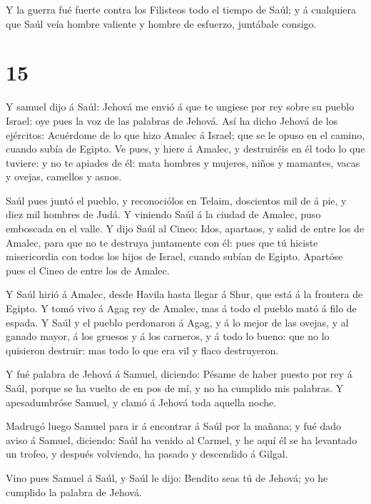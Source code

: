  Y la guerra fué fuerte contra los Filisteos todo el tiempo
de Saúl; y á cualquiera que Saúl veía hombre valiente y hombre de
esfuerzo, juntábale consigo.

\hypertarget{section-14}{%
\section{15}\label{section-14}}

 Y samuel dijo á Saúl: Jehová me envió á que te ungiese por
rey sobre su pueblo Israel: oye pues la voz de las palabras de Jehová.
 Así ha dicho Jehová de los ejércitos: Acuérdome de lo que
hizo Amalec á Israel; que se le opuso en el camino, cuando subía de
Egipto.  Ve pues, y hiere á Amalec, y destruiréis en él todo
lo que tuviere: y no te apiades de él: mata hombres y mujeres, niños y
mamantes, vacas y ovejas, camellos y asnos.

 Saúl pues juntó el pueblo, y reconociólos en Telaim,
doscientos mil de á pie, y diez mil hombres de Judá.  Y
viniendo Saúl á la ciudad de Amalec, puso emboscada en el valle.
 Y dijo Saúl al Cineo: Idos, apartaos, y salid de entre los
de Amalec, para que no te destruya juntamente con él: pues que tú
hiciste misericordia con todos los hijos de Israel, cuando subían de
Egipto. Apartóse pues el Cineo de entre los de Amalec.

 Y Saúl hirió á Amalec, desde Havila hasta llegar á Shur,
que está á la frontera de Egipto.  Y tomó vivo á Agag rey de
Amalec, mas á todo el pueblo mató á filo de espada.  Y Saúl
y el pueblo perdonaron á Agag, y á lo mejor de las ovejas, y al ganado
mayor, á los gruesos y á los carneros, y á todo lo bueno: que no lo
quisieron destruir: mas todo lo que era vil y flaco destruyeron.

 Y fué palabra de Jehová á Samuel, diciendo: 
Pésame de haber puesto por rey á Saúl, porque se ha vuelto de en pos de
mí, y no ha cumplido mis palabras. Y apesadumbróse Samuel, y clamó á
Jehová toda aquella noche.

 Madrugó luego Samuel para ir á encontrar á Saúl por la
mañana; y fué dado aviso á Samuel, diciendo: Saúl ha venido al Carmel, y
he aquí él se ha levantado un trofeo, y después volviendo, ha pasado y
descendido á Gilgal.

 Vino pues Samuel á Saúl, y Saúl le dijo: Bendito seas tú
de Jehová; yo he cumplido la palabra de Jehová.

